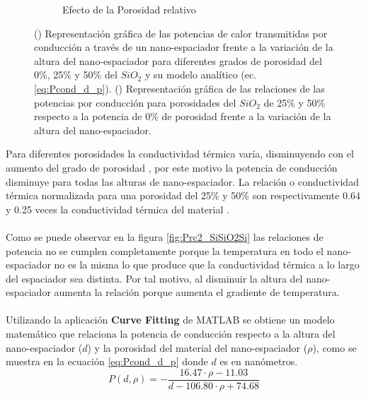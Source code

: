 \begin{figure}[H]
\begin{subfigure}[b]{0.49\textwidth}
		\caption{Efecto de la Porosidad relativo}
		\label{fig:relPpor_SiSiO2Si}
	\end{subfigure}
	\caption[Efectos de la porosidad del nano-espaciador sobre el flujo de calor por conducción]{() Representación gráfica de las potencias de calor transmitidas por conducción  a través de un nano-espaciador frente a la variación de la altura del nano-espaciador para diferentes grados de porosidad del 0\%, 25\% y 50\% del $SiO_2$ y su modelo analítico (ec. \eqref{eq:Pcond_d_p}). () Representación gráfica de las relaciones de las potencias por conducción para porosidades del $SiO_2$ de 25\% y 50\% respecto a la potencia de 0\% de porosidad frente a la variación de la altura del nano-espaciador.}
	\label{fig:PcondPor_SiSiO2Si}
\end{figure}
Para diferentes porosidades la conductividad térmica varía, disminuyendo con el aumento del grado de porosidad \cite{ThermalConductivity_SiO2_2018}, por este motivo la potencia de conducción disminuye para todas las alturas de nano-espaciador. La relación o conductividad térmica normalizada para una porosidad del 25\% y 50\% son respectivamente 0.64 y 0.25 veces la conductividad térmica del material \cite{ThermalConductivity_SiO2_2018}.\\\\
Como se puede observar en la figura \ref{fig:Prc2_SiSiO2Si} las relaciones de potencia no se cumplen completamente porque la temperatura en todo el nano-espaciador no es la misma lo que produce que la conductividad térmica a lo largo del espaciador sea distinta. Por tal motivo, al disminuir la altura del nano-espaciador aumenta la relación porque aumenta el gradiente de temperatura.\\\\
Utilizando la aplicación \textbf{Curve Fitting} de MATLAB se obtiene un modelo matemático que relaciona la potencia de conducción respecto a la altura del nano-espaciador ($d$) y la porosidad del material del nano-espaciador ($\rho$), como se muestra en la ecuación \eqref{eq:Pcond_d_p} donde $d$ es en nanómetros.
\begin{equation}
P(d,\rho)=- \frac{  16.47\cdot \rho-11.03 }{d-106.80\cdot \rho +74.68}
\label{eq:Pcond_d_p}
\end{equation}
